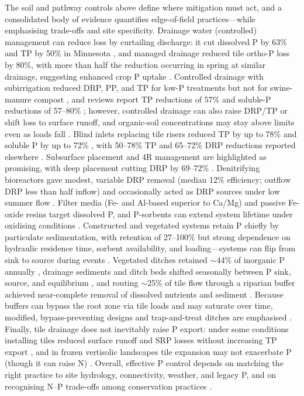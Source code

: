 The soil and pathway controls above define where mitigation must act, and a consolidated body of
evidence quantifies edge-of-field practices---while emphasising trade-offs and site specificity.
Drainage water (controlled) management can reduce loss by curtailing discharge: it cut dissolved P
by 63\% and TP by 50\% in Minnesota \parencite{Kröger2013}, and managed drainage reduced tile
ortho-P loss by 80\%, with more than half the reduction occurring in spring at similar drainage,
suggesting enhanced crop P uptake \parencite{Nash2015c}. Controlled drainage with subirrigation
reduced DRP, PP, and TP for low-P treatments but not for swine-manure compost
\parencite{Zhang2015}, and reviews report TP reductions of 57\% and soluble-P reductions of
57--80\% \parencite{Elsayed2023}; however, controlled drainage can also raise DRP/TP or shift loss
to surface runoff, and organic-soil concentrations may stay above limits even as loads fall
\parencite{Grewal2025,Sadhukhan2019b,Grenon2021}. Blind inlets replacing tile risers reduced TP by
up to 78\% and soluble P by up to 72\% \parencite{Kröger2013}, with 50--78\% TP and 65--72\% DRP
reductions reported elsewhere \parencite{Singh2020c}. Subsurface placement and 4R management are
highlighted as promising, with deep placement cutting DRP by 69--72\%
\parencite{Wilson2019,Sharpley2019,Singh2020c}. Denitrifying bioreactors gave modest, variable DRP
removal (median 12\% efficiency; outflow DRP less than half inflow) and occasionally acted as DRP
sources under low summer flow \parencite{Bailon2025}. Filter media (Fe- and Al-based superior to
Ca/Mg) and passive Fe-oxide resins target dissolved P, and P-sorbents can extend system lifetime
under oxidising conditions \parencite{Mendes2020,Li2020b}. Constructed and vegetated systems retain
P chiefly by particulate sedimentation, with retention of 27--100\% but strong dependence on
hydraulic residence time, sorbent availability, and loading---systems can flip from sink to source
during events \parencite{Mendes2020,Kröger2013,Singh2020c}. Vegetated ditches retained
$\sim$44\% of inorganic P annually \parencite{Kröger2013}, drainage sediments and ditch beds shifted
seasonally between P sink, source, and equilibrium \parencite{Ahiablame2010,Nguyen2002}, and routing
$\sim$25\% of tile flow through a riparian buffer achieved near-complete removal of dissolved
nutrients and sediment \parencite{Jacquemin2020}. Because buffers can bypass the root zone via tile
loads and may saturate over time, modified, bypass-preventing designs and trap-and-treat ditches
are emphasised \parencite{Mendes2020,Millar2025,Baulch2019}. Finally, tile drainage does not
inevitably raise P export: under some conditions installing tiles reduced surface runoff and SRP
losses without increasing TP export \parencite{Klaiber2020}, and in frozen vertisolic landscapes
tile expansion may not exacerbate P (though it can raise N) \parencite{Kokulan2021}. Overall,
effective P control depends on matching the right practice to site hydrology, connectivity, weather,
and legacy P, and on recognising N--P trade-offs among conservation practices
\parencite{King2015,Sharpley2019,Ni2020,Baulch2019,Wilson2019}.